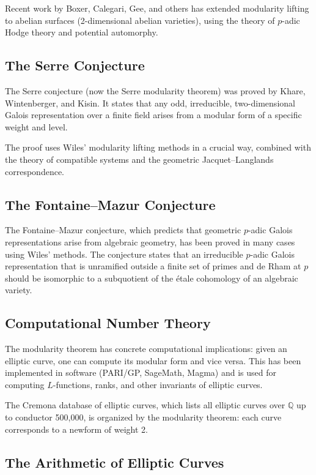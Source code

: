 Recent work by Boxer, Calegari, Gee, and others has extended modularity lifting to abelian surfaces (2-dimensional abelian varieties), using the theory of $p$-adic Hodge theory and potential automorphy.

\subsection{The Serre Conjecture}

The Serre conjecture (now the Serre modularity theorem) was proved by Khare, Wintenberger, and Kisin. It states that any odd, irreducible, two-dimensional Galois representation over a finite field arises from a modular form of a specific weight and level.

The proof uses Wiles' modularity lifting methods in a crucial way, combined with the theory of compatible systems and the geometric Jacquet--Langlands correspondence.

\subsection{The Fontaine--Mazur Conjecture}

The Fontaine--Mazur conjecture, which predicts that geometric $p$-adic Galois representations arise from algebraic geometry, has been proved in many cases using Wiles' methods. The conjecture states that an irreducible $p$-adic Galois representation that is unramified outside a finite set of primes and de Rham at $p$ should be isomorphic to a subquotient of the \'etale cohomology of an algebraic variety.

\subsection{Computational Number Theory}

The modularity theorem has concrete computational implications: given an elliptic curve, one can compute its modular form and vice versa. This has been implemented in software (PARI/GP, SageMath, Magma) and is used for computing $L$-functions, ranks, and other invariants of elliptic curves.

The Cremona database of elliptic curves, which lists all elliptic curves over $\mathbb{Q}$ up to conductor 500,000, is organized by the modularity theorem: each curve corresponds to a newform of weight 2.

\subsection{The Arithmetic of Elliptic Curves}

